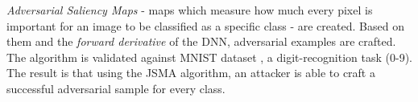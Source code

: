 \textit{Adversarial Saliency Maps} - maps which measure how much every pixel is important for an image to be classified as a specific class - are created. Based on them and the \textit{forward derivative} of the DNN, adversarial examples are crafted. The algorithm is validated against MNIST dataset \cite{datasetMNIST}, a digit-recognition task (0-9). The result is that using the JSMA algorithm, an attacker is able to craft a successful adversarial sample for every class.
